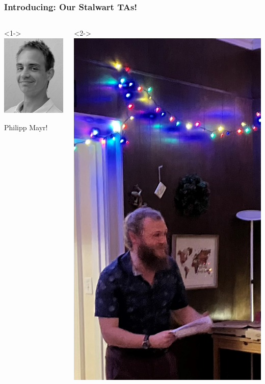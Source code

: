 \begin{frame}
\frametitle{Introducing: Our Stalwart TAs!}

  \begin{columns}
    \begin{column}{.3\textwidth}<1->
      \includegraphics[height=.7\textheight]{../assets/philipp}
      
      Philipp Mayr!
    \end{column}
    \begin{column}{.27\textwidth}<2->
     \includegraphics[height=.7\textheight]{../assets/gareth_cropped}
      

\end{column}
\end{columns}
\end{frame}
